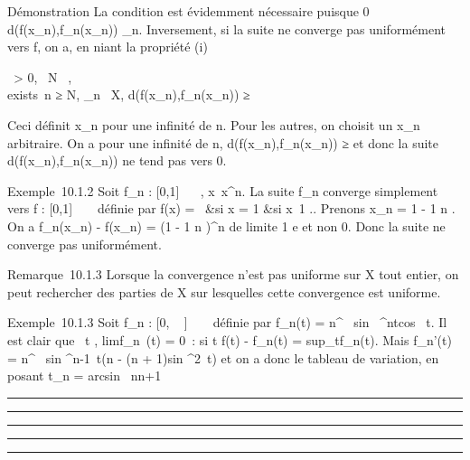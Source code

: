\documentclass[]{article}
\begin{document}
Démonstration La condition est évidemment nécessaire puisque 0 \leq
d(f(x_n),f_n(x_n)) \leq \mu_n.
Inversement, si la suite ne converge pas uniformément vers f, on a, en
niant la propriété (i)

\exists~\epsilon > 0,
\forall~N \in {}~, \\exists~n ≥ N,
\existsx_n~ \in X,\quad
d(f(x_n),f_n(x_n)) ≥ \epsilon

Ceci définit x_n pour une infinité de n. Pour les autres, on
choisit un x_n arbitraire. On a pour une infinité de n,
d(f(x_n),f_n(x_n)) ≥ \epsilon et donc la suite
d(f(x_n),f_n(x_n)) ne tend pas vers 0.

Exemple~10.1.2 Soit f_n : [0,1] \rightarrow~ ~,
x\mapsto~x^n. La suite f_n
converge simplement vers f : [0,1] \rightarrow~ ~ définie par f(x) =
\left \ &si x
= 1 &si x\neq~1 
\right .. Prenons x_n = 1 - 1
\over n . On a f_n(x_n) -
f(x_n) = (1 - 1 \over n )^n de
limite  1 \over e et non 0. Donc la suite ne converge
pas uniformément.

Remarque~10.1.3 Lorsque la convergence n'est pas uniforme sur X tout
entier, on peut rechercher des parties de X sur lesquelles cette
convergence est uniforme.

Exemple~10.1.3 Soit f_n : [0, \pi~ ]
\rightarrow~ ~ définie par f_n(t) =
n^\alpha~ sin~
^ntcos~ t. Il est clair que
\forall~t \in [0, \pi~\over 2~ ],
limf_n~(t) = 0~: si t \in [0,
\pi~\over 2 [ on a 0 \leq sin~ t
< 1 et si t = \pi~\diagup2, on a cos~ t = 0.
La suite converge simplement vers la fonction nulle. On a \mu_n
= sup_t\in[0,\pi~\over
2 ]f(t) - f_n(t)
= sup_t\in[0,\pi~\over
2 ]f_n(t). Mais f_n'(t) =
n^\alpha~ sin ^n-1~t(n - (n +
1)sin ^2~t) et on a donc le tableau
de variation, en posant t_n = arcsin~
\sqrt n\over n+1

\begin{center}\rule{3in}{0.4pt}\end{center}

\begin{center}\rule{3in}{0.4pt}\end{center}

\begin{center}\rule{3in}{0.4pt}\end{center}

\begin{center}\rule{3in}{0.4pt}\end{center}

\begin{center}\rule{3in}{0.4pt}\end{center}
\end{document}
